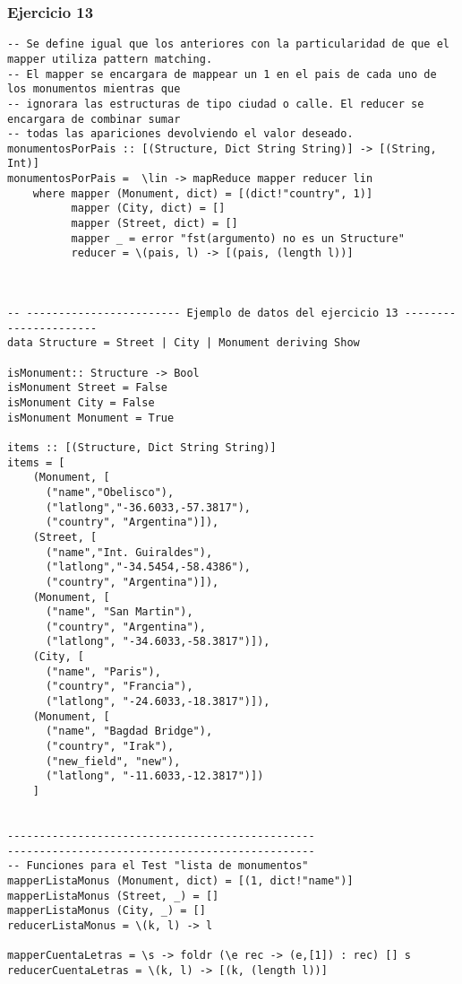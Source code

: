 \subsubsection*{Ejercicio 13}
\begin{lstlisting}
-- Se define igual que los anteriores con la particularidad de que el mapper utiliza pattern matching.
-- El mapper se encargara de mappear un 1 en el pais de cada uno de los monumentos mientras que
-- ignorara las estructuras de tipo ciudad o calle. El reducer se encargara de combinar sumar
-- todas las apariciones devolviendo el valor deseado.
monumentosPorPais :: [(Structure, Dict String String)] -> [(String, Int)]
monumentosPorPais =  \lin -> mapReduce mapper reducer lin
	where mapper (Monument, dict) = [(dict!"country", 1)]
	      mapper (City, dict) = []
	      mapper (Street, dict) = []
	      mapper _ = error "fst(argumento) no es un Structure"
	      reducer = \(pais, l) -> [(pais, (length l))] 



-- ------------------------ Ejemplo de datos del ejercicio 13 ----------------------
data Structure = Street | City | Monument deriving Show

isMonument:: Structure -> Bool
isMonument Street = False
isMonument City = False
isMonument Monument = True

items :: [(Structure, Dict String String)]
items = [
    (Monument, [
      ("name","Obelisco"),
      ("latlong","-36.6033,-57.3817"),
      ("country", "Argentina")]),
    (Street, [
      ("name","Int. Guiraldes"),
      ("latlong","-34.5454,-58.4386"),
      ("country", "Argentina")]),
    (Monument, [
      ("name", "San Martin"),
      ("country", "Argentina"),
      ("latlong", "-34.6033,-58.3817")]),
    (City, [
      ("name", "Paris"),
      ("country", "Francia"),
      ("latlong", "-24.6033,-18.3817")]),
    (Monument, [
      ("name", "Bagdad Bridge"),
      ("country", "Irak"),
      ("new_field", "new"),
      ("latlong", "-11.6033,-12.3817")])
    ]


------------------------------------------------
------------------------------------------------
-- Funciones para el Test "lista de monumentos"
mapperListaMonus (Monument, dict) = [(1, dict!"name")]
mapperListaMonus (Street, _) = []
mapperListaMonus (City, _) = []
reducerListaMonus = \(k, l) -> l

mapperCuentaLetras = \s -> foldr (\e rec -> (e,[1]) : rec) [] s
reducerCuentaLetras = \(k, l) -> [(k, (length l))]

\end{lstlisting}
